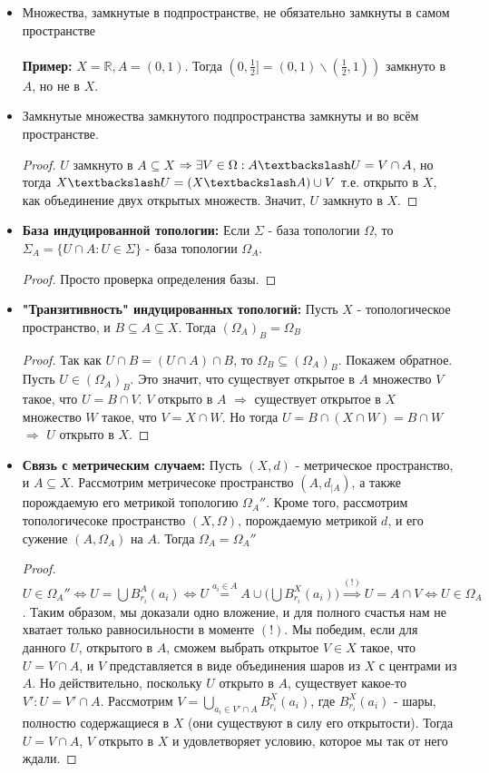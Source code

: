 \documentclass[a4paper,100pt]{article}
\theoremstyle{indented}
\begin{document}
\begin{itemize}
    \item Множества, замкнутые в подпространстве, не обязательно замкнуты в самом пространстве
    \\
    \\
    \textbf{Пример:} $X=\mathbb{R}, A=(0, 1)$. Тогда $(0, \frac{1}{2}]=(0, 1) \backslash (\frac{1}{2}, 1))$ замкнуто в $A$, но не в $X$.
    \item Замкнутые множества замкнутого подпространства замкнуты и во всём пространстве.
    \begin{proof} $U$ замкнуто в $A \subseteq X$ $\Rightarrow \exists V \in \Omega : A \textbackslash U=V \cap A$, но тогда $X \textbackslash U = (X \textbackslash A) \cup V$ т.е. открыто в $X$, как объединение двух открытых множеств. Значит, $U$ замкнуто в $X$.
    \end{proof}
    \item \textbf{База индуцированной топологии:} Если $\Sigma$ - база топологии $\Omega$, то $\Sigma_A=\{U \cap A : U \in \Sigma\}$ - база топологии $\Omega_A$.
    \begin{proof}
    Просто проверка определения базы.
    \end{proof}
    \item \textbf{"Транзитивность" индуцированных топологий:} Пусть $X$ - топологическое пространство, и $B \subseteq A \subseteq X$. Тогда $(\Omega_A)_B=\Omega_B$
    \begin{proof}
    Так как $U \cap B = (U \cap A) \cap B$, то $\Omega_B \subseteq (\Omega_A)_B$. Покажем обратное. Пусть $U \in (\Omega_A)_B$. Это значит, что существует открытое в $A$ множество $V$ такое, что $U=B \cap V$. $V$ открыто в $A$ $\Rightarrow$ существует открытое в $X$ множество $W$ такое, что $V=X \cap W$. Но тогда $U=B \cap (X \cap W) = B \cap W$ $\Rightarrow$ $U$ открыто в $X$.
    \end{proof}
    \item \textbf{Связь с метрическим случаем:} Пусть $(X, d)$ - метрическое пространство, и $A \subseteq X$. Рассмотрим метричесоке пространство $(A, d_{|A})$, а также порождаемую его метрикой топологию $\Omega_A''$. Кроме того, рассмотрим топологичесоке пространство  $(X, \Omega)$, порождаемую метрикой $d$, и его сужение $(A, \Omega_A)$ на $A$. Тогда $\Omega_A=\Omega_A''$
    \begin{proof}
    $U \in \Omega_A'' \Longleftrightarrow U = \bigcup B_{r_i}^A(a_i) \Longleftrightarrow U \overset{a_i \in A}{=} A \cup \Big ( \bigcup B_{r_i}^X(a_i) \Big ) \overset{(!)}{\Longrightarrow} U=A \cap V \Longleftrightarrow U \in \Omega_A$. Таким образом, мы доказали одно вложение, и для полного счастья нам не хватает только равносильности в моменте $(!)$. Мы победим, если для данного $U$, открытого в $A$, сможем выбрать открытое $V \in X$ такое, что $U=V \cap A$, и $V$ представляется в виде объединения шаров из $X$ с центрами из $A$. Но действительно, поскольку $U$ открыто в $A$, существует какое-то $V' : U=V' \cap A$. Рассмотрим $V= \bigcup_{a_i \in V' \cap A} B_{r_i}^X(a_i)$, где $B_{r_i}^X(a_i)$ - шары, полностю содержащиеся в $X$ (они существуют в силу его открытости). Тогда $U=V \cap A$, $V$ открыто в $X$ и удовлетворяет условию, которое мы так от него ждали.

\end{proof}
\end{itemize}
\end{document}
